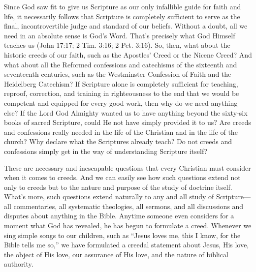 Since God saw fit to give us Scripture as our only infallible guide for faith and life, it necessarily follows that Scripture is completely sufficient to serve as the final, incontrovertible judge and standard of our beliefs. Without a doubt, all we need in an absolute sense is God’s Word. That’s precisely what God Himself teaches us (John 17:17; 2 Tim. 3:16; 2 Pet. 3:16). So, then, what about the historic creeds of our faith, such as the Apostles’ Creed or the Nicene Creed? And what about all the Reformed confessions and catechisms of the sixteenth and seventeenth centuries, such as the Westminster Confession of Faith and the Heidelberg Catechism? If Scripture alone is completely sufficient for teaching, reproof, correction, and training in righteousness to the end that we would be competent and equipped for every good work, then why do we need anything else? If the Lord God Almighty wanted us to have anything beyond the sixty-six books of sacred Scripture, could He not have simply provided it to us? Are creeds and confessions really needed in the life of the Christian and in the life of the church? Why declare what the Scriptures already teach? Do not creeds and confessions simply get in the way of understanding Scripture itself?

\medskip

These are necessary and inescapable questions that every Christian must consider when it comes to creeds. And we can easily see how such questions extend not only to creeds but to the nature and purpose of the study of doctrine itself. What’s more, such questions extend naturally to any and all study of Scripture—all commentaries, all systematic theologies, all sermons, and all discussions and disputes about anything in the Bible. Anytime someone even considers for a moment what God has revealed, he has begun to formulate a creed. Whenever we sing simple songs to our children, such as “Jesus loves me, this I know, for the Bible tells me so,” we have formulated a creedal statement about Jesus, His love, the object of His love, our assurance of His love, and the nature of biblical authority.

\medskip

